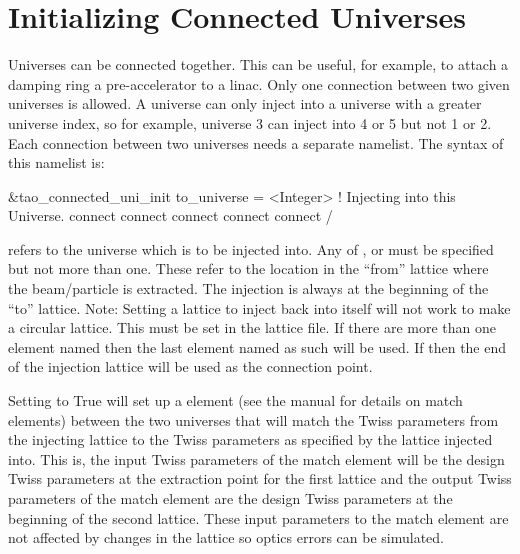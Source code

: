 {{{{{{{{{{{{{{{{%
\section{Initializing Connected Universes}
\label{s:connected.uni}

Universes can be connected together. This can be useful, for example,
to attach a damping ring a pre-accelerator to a linac. Only one
connection between two given universes is allowed.  A universe can
only inject into a universe with a greater universe index, so for
example, universe 3 can inject into 4 or 5 but not 1 or 2. Each
connection between two universes needs a separate
 namelist. The syntax of this namelist is:
\begin{example}
  &tao_connected_uni_init
    to_universe           = <Integer>     ! Injecting into this Universe.
    connect%
    connect%
    connect%
    connect%
    connect%
  /
\end{example}
 refers to the universe which is to be injected
into. Any of ,  or  must be
specified but not more than one. These refer to the location in the
``from'' lattice where the beam/particle is extracted.  The injection
is always at the beginning of the ``to'' lattice. Note: Setting a
lattice to inject back into itself will not work to make a circular
lattice. This must be set in the lattice file.  If there are more than
one element named  then the last element named as such
will be used. If  then the end of the injection
lattice will be used as the connection point.

Setting  to True will set up a  element
(see the \bmad manual for details on match elements) between the two
universes that will match the  Twiss parameters from the
injecting lattice to the  Twiss parameters as specified by
the lattice injected into. This is, the input Twiss parameters of the
match element will be the design Twiss parameters at the extraction
point for the first lattice and the output Twiss parameters of the
match element are the design Twiss parameters at the beginning of the
second lattice. These input parameters to the match element are not
affected by changes in the  lattice so optics errors can be
simulated.

}}}}}}}}}}}}}}}}
